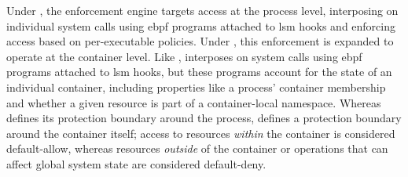 Under \bpfbox{}, the enforcement engine targets access at the process level, interposing
on individual system calls using \gls{ebpf} programs attached to \gls{lsm} hooks and
enforcing access based on per-executable policies. Under \bpfcontain{}, this enforcement
is expanded to operate at the container level. Like \bpfbox{}, \bpfcontain{} interposes on
system calls using \gls{ebpf} programs attached to \gls{lsm} hooks, but these programs
account for the state of an individual container, including properties like a process'
container membership and whether a given resource is part of a container-local namespace.
Whereas \bpfbox{} defines its protection boundary around the process, \bpfcontain{}
defines a protection boundary around the container itself; access to resources
\textit{within} the container is considered default-allow, whereas resources
\textit{outside}  of the container or operations that can affect global system state are
considered default-deny.



